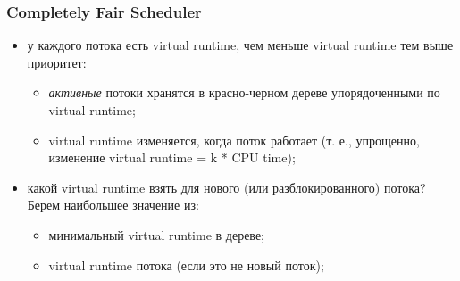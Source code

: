 \begin{frame}
\frametitle{Completely Fair Scheduler}

\begin{itemize}
  \item<1-> у каждого потока есть virtual runtime, чем меньше virtual runtime
        тем выше приоритет:
        \begin{itemize}
          \item \emph{активные} потоки хранятся в красно-черном дереве
                упорядоченными по virtual runtime;
          \item virtual runtime изменяется, когда поток работает (т. е.,
                упрощенно, изменение virtual runtime = k * CPU time);
        \end{itemize}
  \item<2-> какой virtual runtime взять для нового (или разблокированного)
        потока? Берем наибольшее значение из:
        \begin{itemize}
          \item минимальный virtual runtime в дереве;
          \item virtual runtime потока (если это не новый поток);
        \end{itemize}
\end{itemize}
\end{frame}
